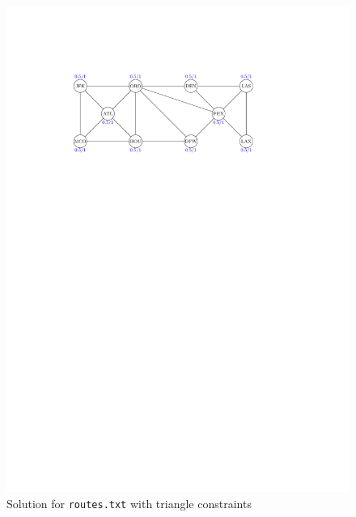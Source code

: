 \documentclass{article}
\begin{document}
\begin{figure}
    \centering
    \includegraphics[page=2]{Assignment4/graphics.pdf}
    \caption{Solution for \lstinline|routes.txt| with triangle constraints}
    \label{fig:routes_t}
\end{figure}





\end{document}
